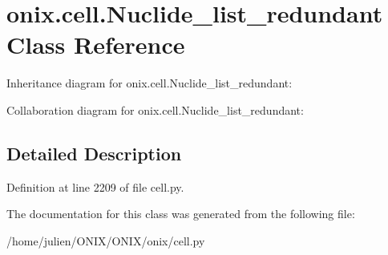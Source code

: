 \hypertarget{classonix_1_1cell_1_1Nuclide__list__redundant}{}\section{onix.\+cell.\+Nuclide\+\_\+list\+\_\+redundant Class Reference}
\label{classonix_1_1cell_1_1Nuclide__list__redundant}


Inheritance diagram for onix.\+cell.\+Nuclide\+\_\+list\+\_\+redundant\+:


Collaboration diagram for onix.\+cell.\+Nuclide\+\_\+list\+\_\+redundant\+:


\subsection{Detailed Description}


Definition at line 2209 of file cell.\+py.



The documentation for this class was generated from the following file\+:\begin{DoxyCompactItemize}
\item 
/home/julien/\+O\+N\+I\+X/\+O\+N\+I\+X/onix/cell.\+py\end{DoxyCompactItemize}
